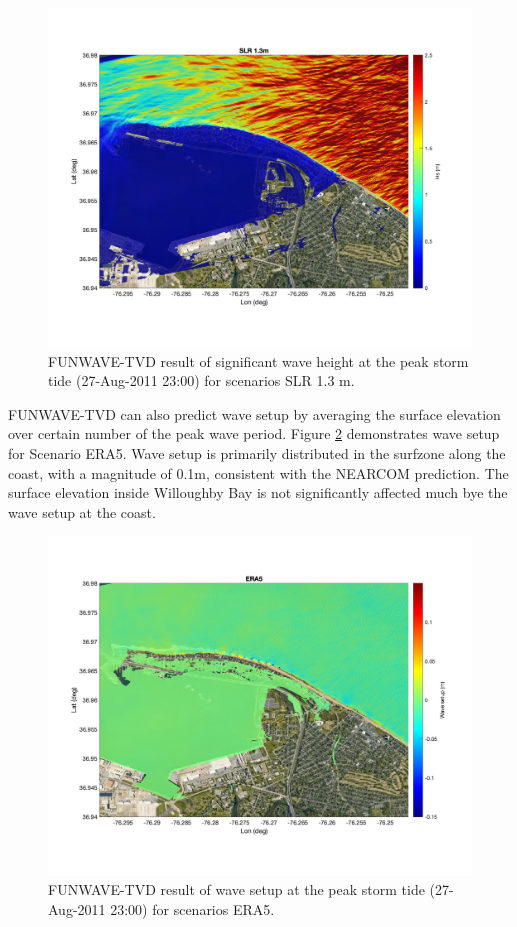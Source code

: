 \documentclass[11pt]{article}
\begin{document}
\begin{figure}[h!]
\centering
\includegraphics[width=\textwidth]{./figures/funwave_SLR_hs.jpg}
\caption{FUNWAVE-TVD result of significant wave height at the peak storm tide (27-Aug-2011 23:00) for scenarios SLR 1.3 m.  }
\label{funwave_SLR_hs}
\centering
\end{figure}

FUNWAVE-TVD can also predict wave setup by averaging the surface elevation over certain number of the peak wave period. Figure \ref{funwave_ERA5_setup} demonstrates wave setup for Scenario ERA5. Wave setup is primarily distributed in the surfzone along the coast, with a magnitude of 0.1m, consistent with the NEARCOM prediction. The surface elevation inside Willoughby Bay is not significantly affected much bye the wave setup at the coast.  

\begin{figure}[h!]
\centering
\includegraphics[width=\textwidth]{./figures/funwave_ERA5_setup.jpg}
\caption{FUNWAVE-TVD result of wave setup at the peak storm tide (27-Aug-2011 23:00) for scenarios ERA5.  }
\label{funwave_ERA5_setup}
\centering
\end{figure}
\end{document}
